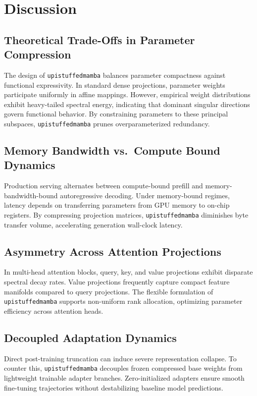 \section{Discussion}

\subsection{Theoretical Trade-Offs in Parameter Compression}
The design of \texttt{upistuffedmamba} balances parameter compactness against functional expressivity. In standard dense projections, parameter weights participate uniformly in affine mappings. However, empirical weight distributions exhibit heavy-tailed spectral energy, indicating that dominant singular directions govern functional behavior. By constraining parameters to these principal subspaces, \texttt{upistuffedmamba} prunes overparameterized redundancy.

\subsection{Memory Bandwidth vs.\ Compute Bound Dynamics}
Production serving alternates between compute-bound prefill and memory-bandwidth-bound autoregressive decoding. Under memory-bound regimes, latency depends on transferring parameters from GPU memory to on-chip registers. By compressing projection matrices, \texttt{upistuffedmamba} diminishes byte transfer volume, accelerating generation wall-clock latency.

\subsection{Asymmetry Across Attention Projections}
In multi-head attention blocks, query, key, and value projections exhibit disparate spectral decay rates. Value projections frequently capture compact feature manifolds compared to query projections. The flexible formulation of \texttt{upistuffedmamba} supports non-uniform rank allocation, optimizing parameter efficiency across attention heads.

\subsection{Decoupled Adaptation Dynamics}
Direct post-training truncation can induce severe representation collapse. To counter this, \texttt{upistuffedmamba} decouples frozen compressed base weights from lightweight trainable adapter branches. Zero-initialized adapters ensure smooth fine-tuning trajectories without destabilizing baseline model predictions.

